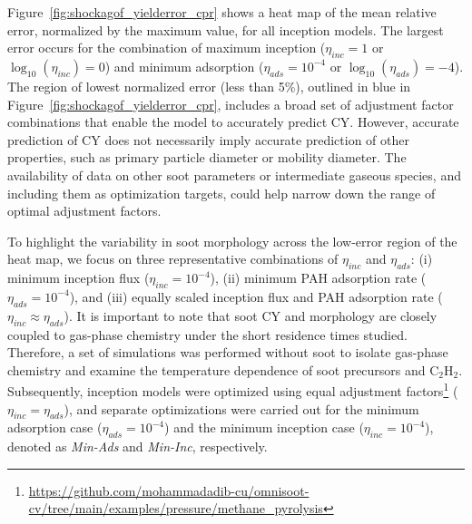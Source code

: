 Figure~\ref{fig:shockagof_yielderror_cpr} shows a heat map of the mean relative error, normalized by the maximum value, for all inception models. The largest error occurs for the combination of maximum inception ($\eta_{inc} = 1$ or $\log_{10}(\eta_{inc}) = 0$) and minimum adsorption ($\eta_{ads} = 10^{-4}$ or $\log_{10}(\eta_{ads}) = -4$). The region of lowest normalized error (less than 5\%), outlined in blue in Figure~\ref{fig:shockagof_yielderror_cpr}, includes a broad set of adjustment factor combinations that enable the model to accurately predict CY. However, accurate prediction of CY does not necessarily imply accurate prediction of other properties, such as primary particle diameter or mobility diameter. The availability of data on other soot parameters or intermediate gaseous species, and including them as optimization targets, could help narrow down the range of optimal adjustment factors.

To highlight the variability in soot morphology across the low-error region of the heat map, we focus on three representative combinations of $\eta_{inc}$ and $\eta_{ads}$: (i) minimum inception flux ($\eta_{inc} = 10^{-4}$), (ii) minimum PAH adsorption rate ($\eta_{ads} = 10^{-4}$), and (iii) equally scaled inception flux and PAH adsorption rate ($\eta_{inc} \approx \eta_{ads}$). It is important to note that soot CY and morphology are closely coupled to gas-phase chemistry under the short residence times studied. Therefore, a set of simulations was performed without soot to isolate gas-phase chemistry and examine the temperature dependence of soot precursors and $\mathrm{C_2H_2}$. Subsequently, inception models were optimized using equal adjustment factors\footnote{\href{https://github.com/mohammadadib-cu/omnisoot-cv/tree/main/examples/pressure/methane_pyrolysis}{https://github.com/mohammadadib-cu/omnisoot-cv/tree/main/examples/pressure/methane\_pyrolysis}} ($\eta_{inc} = \eta_{ads}$), and separate optimizations were carried out for the minimum adsorption case ($\eta_{ads} = 10^{-4}$) and the minimum inception case ($\eta_{inc} = 10^{-4}$), denoted as \textit{Min-Ads} and \textit{Min-Inc}, respectively.


